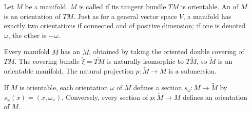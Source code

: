 Let $M$ be a manifold. $M$ is called  if its tangent bundle $TM$ is orientable. An  of $M$ is an orientation of $TM$. Just as for a general vector space $V$, a manifold has exactly two orientations if connected and of positive dimension; if one is denoted $\omega$, the other is $-\omega$.

Every manifold $M$ has an  $\tilde{M}$, obtained by taking the oriented double covering of $TM$. The covering bundle $\tilde{\xi} = \widetilde{TM}$ is naturally isomorphic to $T\tilde{M}$, so $\tilde{M}$ is an orientable manifold. The natural projection $p: \tilde{M} \to M$ is a submersion.

If $M$ is orientable, each orientation $\omega$ of $M$ defines a section $s_\omega: M \to \tilde{M}$ by $s_\omega(x) = (x, \omega_x)$. Conversely, every section of $p: \tilde{M} \to M$ defines an orientation of $M$.
